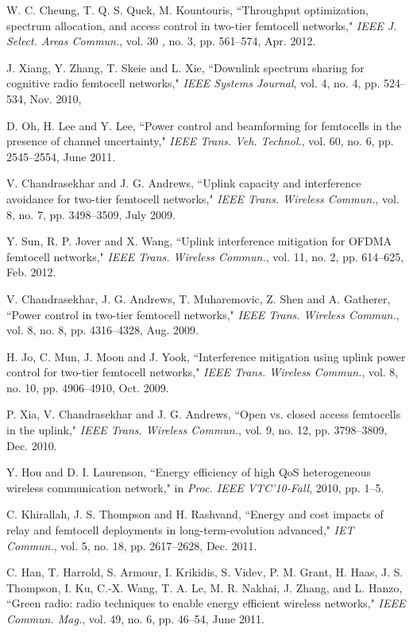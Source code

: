 \documentclass[10pt,final,journal,letterpaper,twoside,twocolumn]{IEEEtran}
\begin{document}
\begin{thebibliography}{1}
W. C. Cheung, T. Q. S. Quek, M. Kountouris, ``Throughput optimization, spectrum allocation, and access control in two-tier femtocell networks," {\em  IEEE J. Select. Areas Commun.},  vol. 30 , no. 3,  pp. 561--574, Apr. 2012.

J. Xiang, Y. Zhang, T. Skeie and L. Xie, ``Downlink spectrum sharing for
cognitive radio femtocell networks," {\em IEEE Systems Journal}, vol. 4, no.
4, pp. 524--534, Nov. 2010,

D. Oh, H. Lee and Y. Lee, ``Power control and beamforming for femtocells in
the presence of channel uncertainty," {\em IEEE Trans. Veh. Technol.}, vol.
60, no. 6, pp. 2545--2554, June 2011.

V. Chandrasekhar and J. G. Andrews, ``Uplink capacity and interference
avoidance for two-tier femtocell networks," {\em IEEE Trans. Wireless
Commun.}, vol. 8, no. 7, pp. 3498--3509, July 2009.

Y. Sun, R. P. Jover and X. Wang, ``Uplink interference mitigation for OFDMA
femtocell networks," {\em IEEE Trans. Wireless Commun.}, vol. 11, no. 2, pp.
614--625, Feb. 2012.

V. Chandrasekhar, J. G. Andrews, T. Muharemovic, Z. Shen and A. Gatherer, ``Power control in two-tier femtocell networks," {\em IEEE Trans. Wireless
Commun.}, vol. 8, no. 8, pp. 4316--4328, Aug. 2009.



    H. Jo, C. Mun, J. Moon and J. Yook, ``Interference mitigation using uplink power control for two-tier femtocell networks," {\em IEEE Trans. Wireless Commun.}, vol. 8, no. 10, pp. 4906--4910, Oct. 2009.

    P. Xia, V. Chandrasekhar and J. G. Andrews, ``Open vs. closed access femtocells in the uplink," {\em IEEE Trans. Wireless Commun.}, vol. 9, no. 12, pp. 3798--3809, Dec. 2010.

    Y. Hou and D. I. Laurenson, ``Energy efficiency of high QoS heterogeneous wireless communication network," in {\em Proc. IEEE VTC'10-Fall}, 2010, pp. 1--5.

    C. Khirallah, J. S. Thompson and H. Rashvand, ``Energy and cost impacts of relay and femtocell deployments in long-term-evolution advanced," {\em IET Commun.}, vol. 5, no. 18, pp. 2617--2628, Dec. 2011.

    C. Han, T. Harrold, S. Armour, I. Krikidis, S. Videv, P. M. Grant, H. Haas, J. S. Thompson, I. Ku, C.-X. Wang, T. A. Le, M. R. Nakhai, J. Zhang, and L. Hanzo, ``Green radio: radio techniques to enable energy efficient wireless networks," {\em IEEE Commun. Mag.}, vol. 49, no. 6, pp. 46--54, June 2011.


\end{thebibliography}
\end{document}
